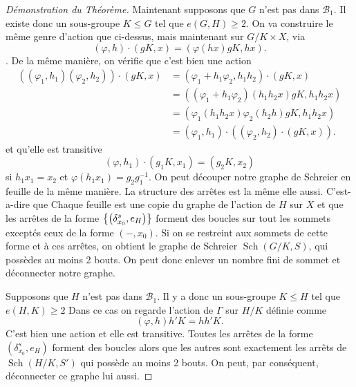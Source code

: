 \documentclass[a4paper]{article}
\theoremstyle{remark}%
\DeclareMathOperator\Sch{Sch}
\DeclarePairedDelimiter\set{\lbrace}{\rbrace}
\renewcommand*{\phi}{\varphi}
\newcommand*{\B}{\mathcal{B}_1}
\begin{document}
\begin{proof}[Démonstration du Théorème]
Maintenant supposons que $G$ n'est pas dans $\B$. Il existe donc un sous-groupe $K \leq G$ tel que $e(G,H) \geq 2$. On va construire le même genre d'action que ci-dessus, mais maintenant sur $G/K \times X$, via 
\begin{equation*}
(\phi,h) \cdot (gK,x) =(\phi(hx)gK,hx).
\end{equation*}.
De la même manière, on vérifie que c'est bien une action
\begin{align*}
\left( (\phi_1,h_1)(\phi_2,h_2)\right) \cdot (gK,x) 	&= (\phi_1+h_1\phi_2,h_1h_2) \cdot (gK,x) \\
												&= ((\phi_1+h_1\phi_2)(h_1h_2x) gK, h_1h_2x) \\
												&= (\phi_1(h_1h_2x)  \phi_2(h_2h)  gK, h_1h_2x) \\
												&=  (\phi_1,h_1)\cdot((\phi_2,h_2)\cdot(gK,x)).
\end{align*}
et qu'elle est transitive
%
\begin{equation*}
(\phi,h_1)\cdot(g_1K,x_1)=(g_2K,x_2)
\end{equation*}
si $h_1x_1=x_2$ et $\phi(h_1x_1)=g_2g_1^{-1}$. On peut découper notre graphe de Schreier en feuille de la même manière. La structure des arrêtes est la même elle aussi. C'est-a-dire que Chaque feuille est une copie du graphe de l'action de $H$ sur $X$ et que les arrêtes de la forme $ \set*{\left(\delta_{x_0}^s,e_H\right)}$ forment des boucles sur tout les sommets exceptés ceux de la forme $(-,x_0)$. Si on se restreint aux sommets de cette forme et à ces arrêtes, on obtient le graphe de Schreier $\Sch(G/K,S)$, qui possèdes au moins 2 bouts. On peut donc enlever un nombre fini de sommet et déconnecter notre graphe. 

Supposons que $H$ n'est pas dans $\B$. Il y a donc un sous-groupe $K \leq H$ tel que $e(H,K) \geq 2$ Dans ce cas on regarde l'action de $\Gamma$ sur $H/K$ définie comme 
\begin{equation*}
(\phi,h)h'K=hh'K.
\end{equation*}
C'est bien une action et elle est transitive. Toutes les arrêtes de la forme $\left(\delta_{x_0}^s,e_H\right)$ forment des boucles alors que les autres sont exactement les arrêts de $\Sch(H/K,S')$ qui possède au moins 2 bouts. On peut, par conséquent, déconnecter ce graphe lui aussi.
\end{proof}
%
%
\nocite{*}




\enddocument
\end{document}
